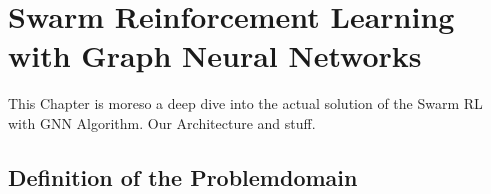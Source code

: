 
\chapter{Swarm Reinforcement Learning with Graph Neural Networks}
\label{ch:Architecture}
This Chapter is moreso a deep dive into the actual solution of the Swarm RL with GNN Algorithm. Our Architecture and stuff.
\section{Definition of the Problemdomain}
